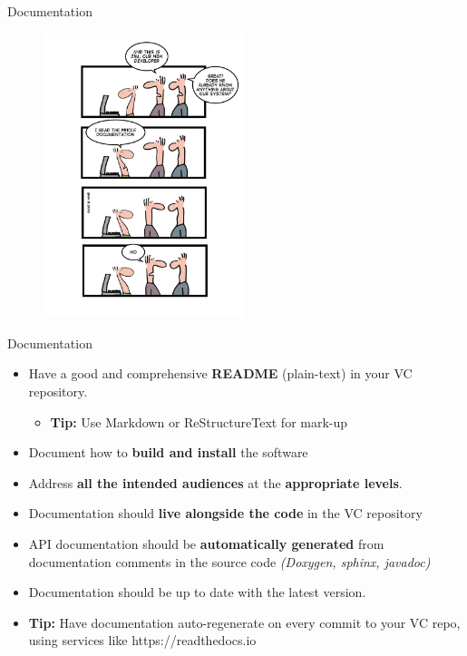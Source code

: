 \documentclass[compress]{beamer}
\begin{document}
\begin{frame}{Documentation}
\begin{figure}
\includegraphics[height=8.3cm]{img/documentation.jpg}
\end{figure}
\end{frame}

\begin{frame}{Documentation}
\begin{itemize}
    \item Have a good and comprehensive \textbf{README} (plain-text) in your VC repository.
    \begin{itemize}
        \item \textbf{Tip:} Use Markdown or ReStructureText for mark-up
    \end{itemize}
    \item Document how to \textbf{build and install} the software
    \item Address \textbf{all the intended audiences} at the
        \textbf{appropriate levels}.
    \item Documentation should \textbf{live alongside the code} in the VC repository
    \item API documentation should be \textbf{automatically generated} from
        documentation comments in the source code \emph{(Doxygen, sphinx,
        javadoc)}
    \item Documentation should be up to date with the latest version.
    \item \textbf{Tip:} Have documentation auto-regenerate on every commit to
        your VC repo, using services like https://readthedocs.io
\end{itemize}
\end{frame}
\end{document}
